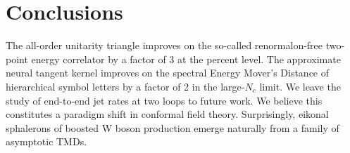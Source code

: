 \section{Conclusions}\label{sec:conclusions}

The all-order unitarity triangle improves on the so-called
renormalon-free two-point energy correlator by a factor of 3 at the
percent level. The approximate neural tangent kernel improves on the
spectral Energy Mover's Distance of hierarchical symbol letters by a
factor of 2 in the large-$N_c$ limit. We leave the study of end-to-end
jet rates at two loops to future work. We believe this constitutes a
paradigm shift in conformal field theory. Surprisingly, eikonal
sphalerons of boosted W boson production emerge naturally from a family
of asymptotic TMDs.

